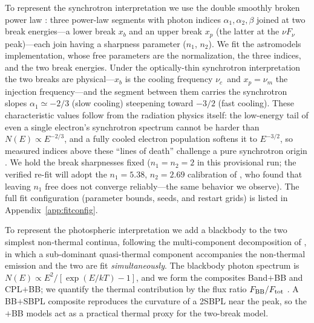 \documentclass[twocolumn]{aastex631}
\newcommand{\nuc}{\ensuremath{\nu_c}}
\newcommand{\num}{\ensuremath{\nu_m}}
\newcommand{\kT}{\ensuremath{kT}}
\begin{document}
To represent the synchrotron interpretation we use the double smoothly broken
power law \citep[2SBPL;][whose Equations~1--4 give the functional
form]{Ravasio2018}: three power-law segments with photon indices
$\alpha_1,\alpha_2,\beta$ joined at two break energies---a lower break $x_b$
and an upper break $x_p$ (the latter at the $\nu F_\nu$ peak)---each join
having a sharpness parameter ($n_1$, $n_2$). We fit the
\textsf{astromodels} implementation, whose free parameters are the
normalization, the three indices, and the two break energies. Under the
optically-thin synchrotron interpretation the two breaks are
physical---$x_b$ is the cooling frequency \nuc\ and $x_p=\num$ the injection
frequency---and the segment between them carries the synchrotron slopes
$\alpha_1\simeq-2/3$ (slow cooling) steepening toward $-3/2$ (fast cooling).
These characteristic values follow from the radiation physics itself: the
low-energy tail of even a single electron's synchrotron spectrum cannot be
harder than $N(E)\propto E^{-2/3}$, and a fully cooled electron population
softens it to $E^{-3/2}$, so measured indices above these ``lines of death''
challenge a pure synchrotron origin
\citep[][]{Preece1998,Sari1998,Ravasio2019}. We hold the break sharpnesses fixed
($n_1=n_2=2$ in this provisional run; the verified re-fit will adopt the
$n_1=5.38$, $n_2=2.69$ calibration of \citealt{Ravasio2018}, who found that
leaving $n_1$ free does not converge reliably---the same behavior we observe).
The full fit configuration (parameter bounds, seeds, and restart grids) is
listed in Appendix~\ref{app:fitconfig}.

To represent the photospheric interpretation we add a blackbody to the two
simplest non-thermal continua, following the multi-component decomposition of
\citet{Guiriec2011,Guiriec2015}, in which a sub-dominant quasi-thermal component
accompanies the non-thermal emission and the two are fit \emph{simultaneously}.
The blackbody photon spectrum is $N(E)\propto E^{2}/[\exp(E/\kT)-1]$, and we form
the composites Band$+$BB and CPL$+$BB; we quantify the thermal contribution by the
flux ratio $F_{\rm BB}/F_{\rm tot}$ \citep{Guiriec2015}. A BB$+$SBPL composite
reproduces the curvature of a 2SBPL near the peak, so the $+$BB models act as a
practical thermal proxy for the two-break model.
\end{document}
